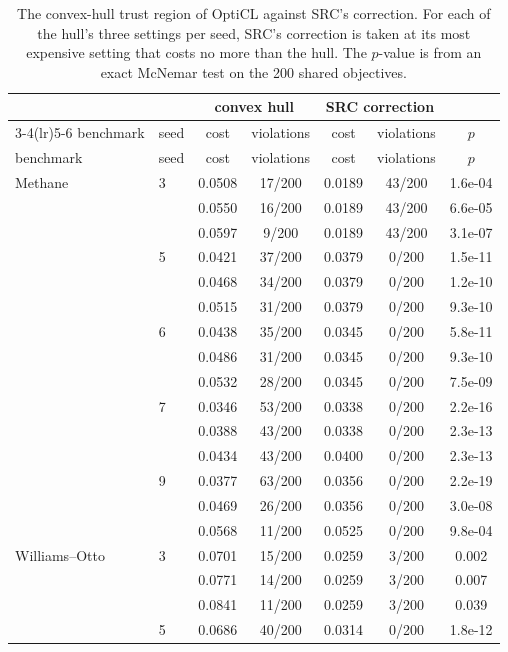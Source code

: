 {\scriptsize
\begin{longtable}{llccccc}
\caption{The convex-hull trust region of OptiCL against SRC's correction. For each of the
hull's three settings per seed, SRC's correction is taken at its most expensive setting
that costs no more than the hull. The $p$-value is from an exact McNemar test on the 200
shared objectives.}
\label{tab:opticl}\\
\toprule
 & & \multicolumn{2}{c}{convex hull} & \multicolumn{2}{c}{SRC correction} & \\
\cmidrule(lr){3-4}\cmidrule(lr){5-6}
benchmark & seed & cost & violations & cost & violations & $p$ \\
\midrule
\endfirsthead
\toprule
benchmark & seed & cost & violations & cost & violations & $p$ \\
\midrule
\endhead
Methane & 3 & 0.0508 & 17/200 & 0.0189 & 43/200 & 1.6e-04 \\
 &  & 0.0550 & 16/200 & 0.0189 & 43/200 & 6.6e-05 \\
 &  & 0.0597 & 9/200 & 0.0189 & 43/200 & 3.1e-07 \\
 & 5 & 0.0421 & 37/200 & 0.0379 & 0/200 & 1.5e-11 \\
 &  & 0.0468 & 34/200 & 0.0379 & 0/200 & 1.2e-10 \\
 &  & 0.0515 & 31/200 & 0.0379 & 0/200 & 9.3e-10 \\
 & 6 & 0.0438 & 35/200 & 0.0345 & 0/200 & 5.8e-11 \\
 &  & 0.0486 & 31/200 & 0.0345 & 0/200 & 9.3e-10 \\
 &  & 0.0532 & 28/200 & 0.0345 & 0/200 & 7.5e-09 \\
 & 7 & 0.0346 & 53/200 & 0.0338 & 0/200 & 2.2e-16 \\
 &  & 0.0388 & 43/200 & 0.0338 & 0/200 & 2.3e-13 \\
 &  & 0.0434 & 43/200 & 0.0400 & 0/200 & 2.3e-13 \\
 & 9 & 0.0377 & 63/200 & 0.0356 & 0/200 & 2.2e-19 \\
 &  & 0.0469 & 26/200 & 0.0356 & 0/200 & 3.0e-08 \\
 &  & 0.0568 & 11/200 & 0.0525 & 0/200 & 9.8e-04 \\
\addlinespace[3pt]
Williams--Otto & 3 & 0.0701 & 15/200 & 0.0259 & 3/200 & 0.002 \\
 &  & 0.0771 & 14/200 & 0.0259 & 3/200 & 0.007 \\
 &  & 0.0841 & 11/200 & 0.0259 & 3/200 & 0.039 \\
 & 5 & 0.0686 & 40/200 & 0.0314 & 0/200 & 1.8e-12 \\

\end{longtable}}
